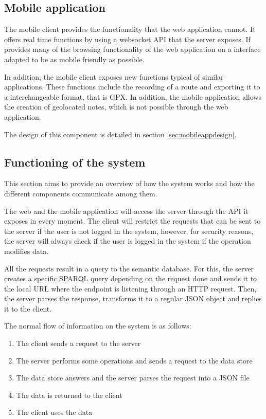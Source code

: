 \subsection{Mobile application}

The mobile client provides the functionality that the web application cannot. It offers real time functions by using a websocket API that the server exposes. If provides many of the browsing functionality of the web application on a interface adapted to be as mobile friendly as possible.

In addition, the mobile client exposes new functions typical of similar applications. These functions include the recording of a route and exporting it to a interchangeable format, that is GPX. In addition, the mobile application allows the creation of geolocated notes, which is not possible through the web application.

The design of this component is detailed in section \ref{sec:mobileappdesign}.

\subsection{Functioning of the system}

This section aims to provide an overview of how the system works and how the different components communicate among them.

The web and the mobile application will access the server through the API it exposes in every moment. The client will restrict the requests that can be sent to the server if the user is not logged in the system, however, for security reasons, the server will always check if the user is logged in the system if the operation modifies data.

All the requests result in a query to the semantic database. For this, the server creates a specific SPARQL query depending on the request done and sends it to the local URL where the endpoint is listening through an HTTP request. Then, the server parses the response, transforms it to a regular JSON object and replies it to the client.

The normal flow of information on the system is as follows: 

\begin{enumerate}
\item The client sends a request to the server
\item The server performs some operations and sends a request to the data store
\item The data store answers and the server parses the request into a JSON file
\item The data is returned to the client
\item The client uses the data
\end{enumerate}

